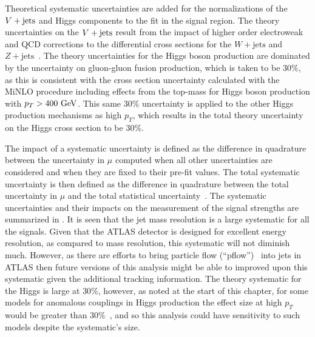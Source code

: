 Theoretical systematic uncertainties are added for the normalizations of the $V + \text{jets}$ and Higgs components to the fit in the signal region.
The theory uncertainties on the $V + \text{jets}$ result from the impact of higher order electroweak and QCD corrections to the differential cross sections for the $W+\mathrm{jets}$ and $Z+\mathrm{jets}$~\cite{Lindert:2017olm}.
The theory uncertainties for the Higgs boson production are dominated by the uncertainty on gluon-gluon fusion production, which is taken to be $30\%$, as this is consistent with the cross section uncertainty calculated with the MiNLO procedure including effects from the top-mass for Higgs boson production with $p_{T}> 400~\mathrm{GeV}$.
This same $30\%$ uncertainty is applied to the other Higgs production mechanisms as high $p_{T}$, which results in the total theory uncertainty on the Higgs cross section to be $30\%$.

The impact of a systematic uncertainty is defined as the difference in quadrature between the uncertainty in $\mu$ computed when all other uncertainties are considered and when they are fixed to their pre-fit values.
The total systematic uncertainty is then defined as the difference in quadrature between the total uncertainty in $\mu$ and the total statistical uncertainty~\cite{ATLAS-CONF-2018-052}.
The systematic uncertainties and their impacts on the measurement of the signal strengths are summarized in .
It is seen that the jet mass resolution is a large systematic for all the signals.
Given that the ATLAS detector is designed for excellent energy resolution, as compared to mass resolution, this systematic will not diminish much.
However, as there are efforts to bring particle flow (``pflow'')~\cite{PERF-2015-09} into \largeR{} jets in ATLAS then future versions of this analysis might be able to improved upon this systematic given the additional tracking information.
The theory systematic for the Higgs is large at $30\%$, however, as noted at the start of this chapter, for some models for anomalous couplings in Higgs production the effect size at high $p_{T}$ would be greater than $30\%$~\cite{Grojean:2013nya,Dawson:2015gka}, and so this analysis could have sensitivity to such models despite the systematic's size.

